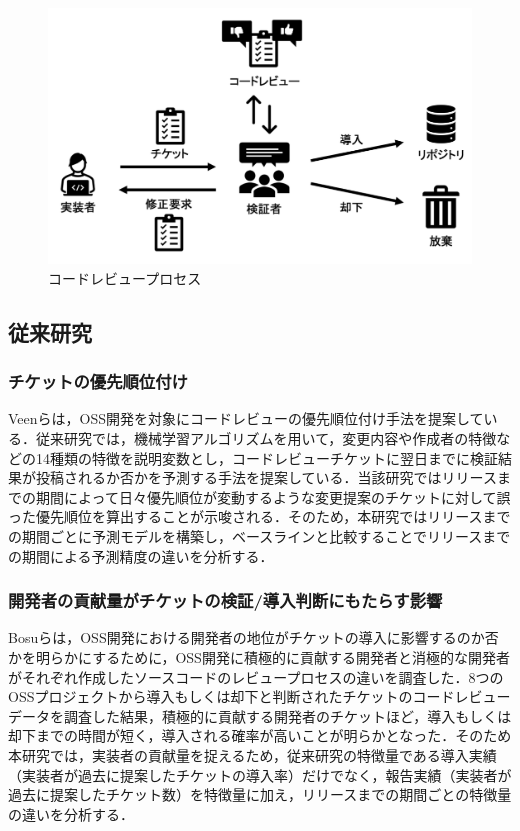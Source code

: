 \documentclass[T,J]{fose} %
\begin{document}
\begin{figure}[t]
\begin{center}
\includegraphics[width=1.0\linewidth]{Uenaka_fig/code_review_process.pdf}
\caption{コードレビュープロセス}
\label{fig:codereviewprocess}
\end{center}
\end{figure}

\subsection{従来研究}

\subsubsection{チケットの優先順位付け}
Veen\cite{prioritizer}らは，OSS開発を対象にコードレビューの優先順位付け手法を提案している．従来研究では，機械学習アルゴリズムを用いて，変更内容や作成者の特徴などの14種類の特徴を説明変数とし，コードレビューチケットに翌日までに検証結果が投稿されるか否かを予測する手法を提案している．当該研究ではリリースまでの期間によって日々優先順位が変動するような変更提案のチケットに対して誤った優先順位を算出することが示唆される．そのため，本研究ではリリースまでの期間ごとに予測モデルを構築し，ベースラインと比較することでリリースまでの期間による予測精度の違いを分析する．

\subsubsection{開発者の貢献量がチケットの検証/導入判断にもたらす影響}
Bosu\cite{review1}らは，OSS開発における開発者の地位がチケットの導入に影響するのか否かを明らかにするために，OSS開発に積極的に貢献する開発者と消極的な開発者がそれぞれ作成したソースコードのレビュープロセスの違いを調査した．8つのOSSプロジェクトから導入もしくは却下と判断されたチケットのコードレビューデータを調査した結果，積極的に貢献する開発者のチケットほど，導入もしくは却下までの時間が短く，導入される確率が高いことが明らかとなった．そのため本研究では，実装者の貢献量を捉えるため，従来研究\cite{prioritizer}の特徴量である導入実績（実装者が過去に提案したチケットの導入率）だけでなく，報告実績（実装者が過去に提案したチケット数）を特徴量に加え，リリースまでの期間ごとの特徴量の違いを分析する．
\end{document}
